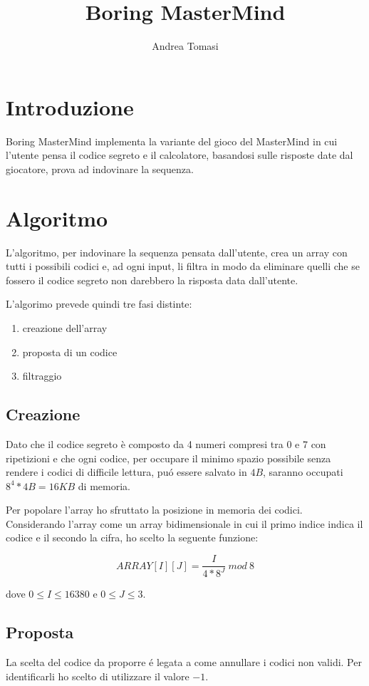 \documentclass{article}
\title{Boring MasterMind}
\author{Andrea Tomasi}
\begin{document}
\maketitle

\section{Introduzione}
Boring MasterMind implementa la variante del gioco del MasterMind in cui l'utente pensa il codice segreto e il calcolatore, basandosi sulle risposte date dal giocatore, prova ad indovinare la sequenza.

\section{Algoritmo}
L'algoritmo, per indovinare la sequenza pensata dall'utente, crea un array con tutti i possibili codici e, ad ogni input, li filtra in modo da eliminare quelli che se fossero il codice segreto non darebbero la risposta data dall'utente.

L'algorimo prevede quindi tre fasi distinte:
\begin{enumerate}
\item creazione dell'array
\item proposta di un codice
\item filtraggio
\end{enumerate}

\subsection{Creazione}
Dato che il codice segreto \`e composto da 4 numeri compresi tra 0 e 7 con ripetizioni e che ogni codice, per occupare il minimo spazio possibile senza rendere i codici di difficile lettura, pu\'o essere salvato in $4B$, saranno occupati $8^4*4B = 16KB$ di memoria.

Per popolare l'array ho sfruttato la posizione in memoria dei codici. Considerando l'array come un array bidimensionale in cui il primo indice indica il codice e il secondo la cifra, ho scelto la seguente funzione: 
  
$$ARRAY[I][J] = \frac{I}{4*8^J}\ mod\ 8$$

dove $0 \le I \le 16380$ e $ 0 \le J \le 3$. 

\subsection{Proposta}
La scelta del codice da proporre \'e legata a come annullare i codici non validi. Per identificarli ho scelto di utilizzare il valore $-1$. 
\end{document}
